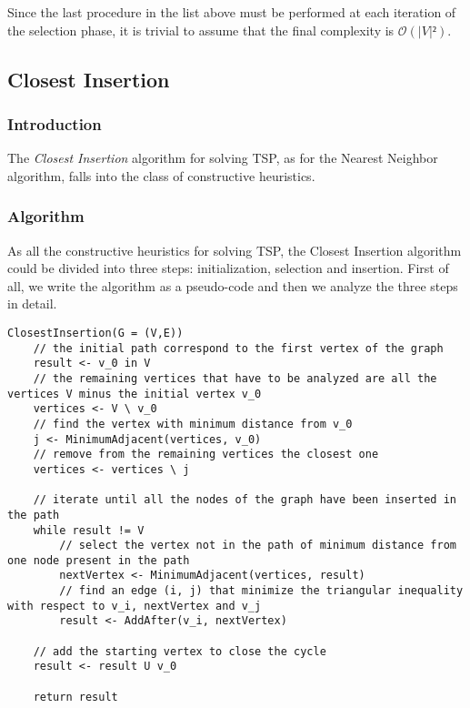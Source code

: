Since the last procedure in the list above must be performed at each iteration of the selection phase, it is trivial to assume that the final complexity is $\mathcal{O}(|V|²)$.

\subsection{Closest Insertion}

\subsubsection{Introduction}
The \textit{Closest Insertion} algorithm for solving TSP, as for the Nearest Neighbor algorithm, falls into the class of constructive heuristics.

\subsubsection{Algorithm}
As all the constructive heuristics for solving TSP, the Closest Insertion algorithm could be divided into three steps: initialization, selection and insertion. First of all, we write the algorithm as a pseudo-code and then we analyze the three steps in detail.

\begin{verbatim}
ClosestInsertion(G = (V,E))
    // the initial path correspond to the first vertex of the graph
    result <- v_0 in V
    // the remaining vertices that have to be analyzed are all the vertices V minus the initial vertex v_0
    vertices <- V \ v_0
    // find the vertex with minimum distance from v_0
    j <- MinimumAdjacent(vertices, v_0)
    // remove from the remaining vertices the closest one
    vertices <- vertices \ j
    
    // iterate until all the nodes of the graph have been inserted in the path
    while result != V
        // select the vertex not in the path of minimum distance from one node present in the path
        nextVertex <- MinimumAdjacent(vertices, result)
        // find an edge (i, j) that minimize the triangular inequality with respect to v_i, nextVertex and v_j
        result <- AddAfter(v_i, nextVertex)
    
    // add the starting vertex to close the cycle
    result <- result U v_0
    
    return result
\end{verbatim}

